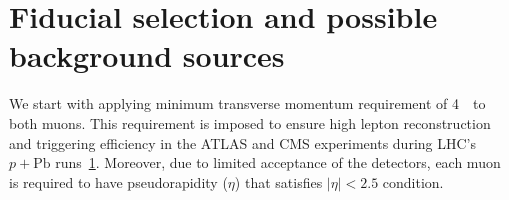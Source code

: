 \section{Fiducial selection and possible background sources}
We start with applying minimum transverse momentum requirement of 4~\GeV\ to both muons.
This requirement is imposed to ensure high lepton reconstruction and triggering efficiency in the ATLAS and CMS experiments during LHC's $p+\textrm{Pb}$ runs~\ref{}.
Moreover, due to limited acceptance of the detectors, each muon is required to have pseudorapidity ($\eta$) that satisfies $|\eta|<2.5$ condition.



